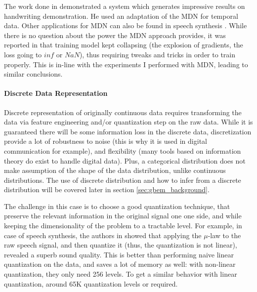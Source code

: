       \par The work done in \citet{graves2013generating} demonstrated a system which generates impressive results on handwriting demonstration. He used an adaptation of the MDN for temporal data. Other applications for MDN can also be found in speech synthesis \citep{zen2014deep,wang2016gating,Wang2017AnAR}. While there is no question about the power the MDN approach provides, it was reported in \citep{graves2013generating} that training model kept collapsing (the explosion of gradients, the loss going to $inf$ or $NaN$), thus requiring tweaks and tricks in order to train properly. This is in-line with the experiments I performed with MDN, leading to similar conclusions.
    \paragraph{Discrete Data Representation}
      \par Discrete representation of originally continuous data requires transforming the data via feature engineering and/or quantization step on the raw data. While it is guaranteed there will be some information loss in the discrete data, discretization provide a lot of robustness to noise (this is why it is used in digital communication for example), and flexibility (many tools based on information theory do exist to handle digital data). Plus, a categorical distribution does not make assumption of the shape of the data distribution, unlike continuous distributions. The use of discrete distribution and how to infer from a discrete distribution will be covered later in section \ref{sec:gbem_background}.

      \par The challenge in this case is to choose a good quantization technique, that preserve the relevant information in the original signal one one side, and while keeping the dimensionality of the problem to a tractable level. For example, in case of speech synthesis, the authors in \citep{oord2016pixel,oord2016wavenet} showed that applying the $\mu$-law to the raw speech signal, and then quantize it (thus, the quantization is not linear), revealed a superb sound quality. This is better than performing naive linear quantization on the data, and saves a lot of memory as well: with non-linear quantization, they only need 256 levels. To get a similar behavior with linear quantization, around 65K quantization levels or required.

